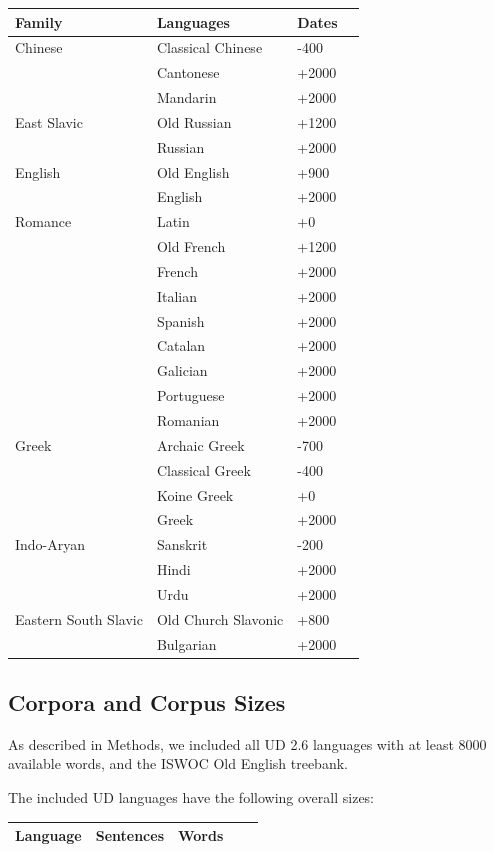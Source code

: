 \documentclass[11pt,a4paper]{article}
\begin{document}
\begin{tabular}{llll} \hline
Family & Languages & Dates \\ \hline\hline
Chinese & Classical Chinese & -400  \\
& Cantonese & +2000\\ 
& Mandarin & +2000 \\ \hline
East Slavic & Old Russian & +1200 \\
& Russian & +2000 \\ \hline
English & Old English & +900 \\
& English  & +2000\\ \hline
Romance & Latin &+0  \\
& Old French &+1200\\
& French  & +2000\\
& Italian & +2000\\
& Spanish & +2000\\
& Catalan & +2000\\
& Galician & +2000\\
& Portuguese & +2000\\
& Romanian & +2000\\ \hline
Greek & Archaic Greek & -700 \\
      & Classical Greek & -400 \\
      & Koine Greek & +0\\
& Greek  & +2000\\ \hline
Indo-Aryan & Sanskrit & -200 \\
& Hindi  & +2000\\
& Urdu  & +2000\\ \hline
Eastern South Slavic & Old Church Slavonic & +800 \\
& Bulgarian  & +2000\\ \hline
\end{tabular}


\subsection{Corpora and Corpus Sizes}

As described in Methods, we included all UD 2.6 languages with at least 8000 available words, and the ISWOC Old English treebank.

The included UD languages have the following overall sizes:

\begin{longtable}{lllll}
Language & Sentences & Words \\ \hline
\end{longtable}
\end{document}
